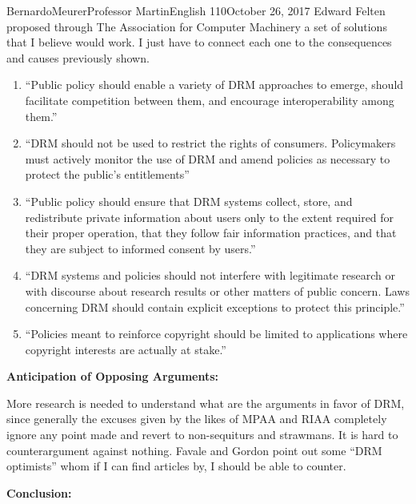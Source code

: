 \documentclass[12pt,letterpaper]{article}
\begin{document}
\begin{mla}{Bernardo}{Meurer}{Professor Martin}{English 110}{October 26, 2017}
        Edward Felten proposed through The Association for Computer Machinery a set of solutions that I believe would work. I just have to connect each one to the consequences and causes previously shown. 
        \begin{enumerate}
            \item ``Public policy should enable a variety of DRM approaches to emerge, should facilitate competition between them, and encourage interoperability among them.''
            \item ``DRM should not be used to restrict the rights of consumers. Policymakers must actively monitor the use of DRM and amend policies as necessary to protect the public's entitlements''
            \item ``Public policy should ensure that DRM systems collect, store, and redistribute private information about users only to the extent required for their proper operation, that they follow fair information practices, and that they are subject to informed consent by users.''
            \item ``DRM systems and policies should not interfere with legitimate research or with discourse about research results or other matters of public concern. Laws concerning DRM should contain explicit exceptions to protect this principle.''
            \item ``Policies meant to reinforce copyright should be limited to applications where copyright interests are actually at stake.''
        \end{enumerate}

        \noindent \textbf{Anticipation of Opposing Arguments:}

        More research is needed to understand what are the arguments in favor of DRM, since generally the excuses given by the likes of MPAA and RIAA completely ignore any point made and revert to non-sequiturs and strawmans. It is hard to counterargument against nothing. Favale and Gordon point out some ``DRM optimists'' whom if I can find articles by, I should be able to counter.

        \noindent \textbf{Conclusion:}


\end{mla}
\end{document}
